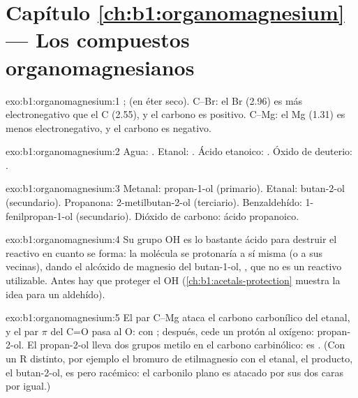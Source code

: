 \section*{Capítulo \ref{ch:b1:organomagnesium} --- Los compuestos organomagnesianos}

\begin{solution}{exo:b1:organomagnesium:1}
;  (en éter
seco). C--Br: el Br (2.96) es más electronegativo que el C (2.55), y el
carbono es positivo. C--Mg: el Mg (1.31) es menos electronegativo, y el
carbono es negativo.
\end{solution}

\begin{solution}{exo:b1:organomagnesium:2}
Agua: .
Etanol: .
Ácido etanoico: .
Óxido de deuterio: .
\end{solution}

\begin{solution}{exo:b1:organomagnesium:3}
Metanal: propan-1-ol (primario). Etanal: butan-2-ol (secundario).
Propanona: 2-metilbutan-2-ol (terciario). Benzaldehído:
1-fenilpropan-1-ol (secundario). Dióxido de carbono: ácido propanoico.
\end{solution}

\begin{solution}{exo:b1:organomagnesium:4}
Su grupo OH es lo bastante ácido para destruir el reactivo en cuanto se
forma: la molécula se protonaría a sí misma (o a sus vecinas), dando el
alcóxido de magnesio del butan-1-ol, , que no es un
reactivo utilizable. Antes hay que proteger el OH
(\cref{ch:b1:acetals-protection} muestra la idea para un aldehído).
\end{solution}

\begin{solution}{exo:b1:organomagnesium:5}
El par C--Mg ataca el carbono carbonílico del etanal, y el par $\pi$ del
C=O pasa al O:  con ; después,  cede
un protón al oxígeno: propan-2-ol. El propan-2-ol lleva dos grupos metilo
en el carbono carbinólico: es . (Con un R distinto, por ejemplo
el bromuro de etilmagnesio con el etanal, el producto, el butan-2-ol, es
 pero racémico: el carbonilo plano es atacado por sus dos caras por
igual.)
\end{solution}

